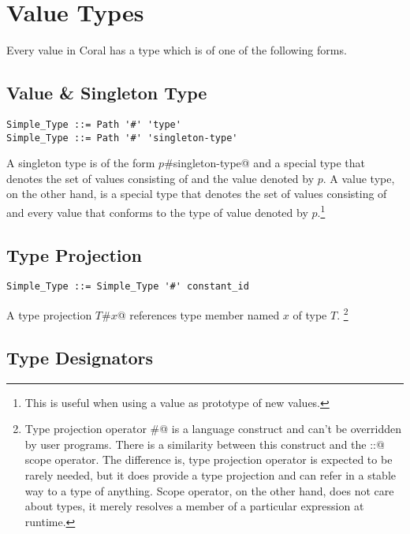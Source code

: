 \section{Value Types}

Every value in Coral has a type which is of one of the following forms. 

\subsection{Value \& Singleton Type}
\label{sec:value-types}
\label{sec:singleton-types}

\syntax\begin{lstlisting}
Simple_Type ::= Path '#' 'type'
Simple_Type ::= Path '#' 'singleton-type'
\end{lstlisting}

A singleton type is of the form \lstinline@$p$#singleton-type@ and a special type that denotes the set of values consisting of  and the value denoted by $p$. A value type, on the other hand, is a special type that denotes the set of values consisting of  and every value that conforms to the type of value denoted by $p$.\footnote{This is useful when using a value as prototype of new values.}

\subsection{Type Projection}
\label{sec:type-projection}

\syntax\begin{lstlisting}
Simple_Type ::= Simple_Type '#' constant_id
\end{lstlisting}

A type projection \lstinline@$T$#$x$@ references type member named $x$ of type $T$. \footnote{Type projection operator \lstinline@#@ is a language construct and can't be overridden by user programs. There is a similarity between this construct and the \lstinline@::@ scope operator. The difference is, type projection operator is expected to be rarely needed, but it does provide a type projection and can refer in a stable way to a type of anything. Scope operator, on the other hand, does not care about types, it merely resolves a member of a particular expression at runtime.}

\subsection{Type Designators}

